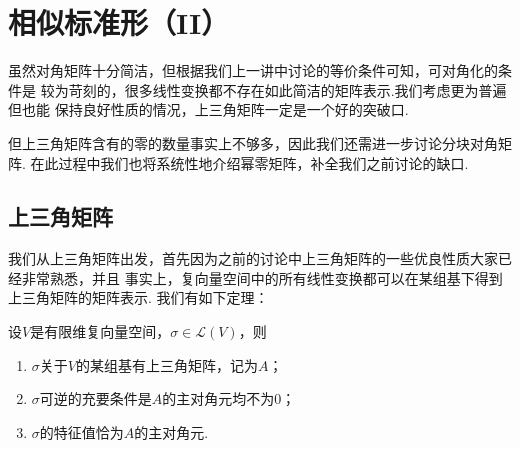 \chapter{相似标准形（II）}

虽然对角矩阵十分简洁，但根据我们上一讲中讨论的等价条件可知，可对角化的条件是
较为苛刻的，很多线性变换都不存在如此简洁的矩阵表示.我们考虑更为普遍但也能
保持良好性质的情况，上三角矩阵一定是一个好的突破口.

但上三角矩阵含有的零的数量事实上不够多，因此我们还需进一步讨论分块对角矩阵.
在此过程中我们也将系统性地介绍幂零矩阵，补全我们之前讨论的缺口.

\section{上三角矩阵}
我们从上三角矩阵出发，首先因为之前的讨论中上三角矩阵的一些优良性质大家已经非常熟悉，并且
事实上，复向量空间中的所有线性变换都可以在某组基下得到上三角矩阵的矩阵表示.
我们有如下定理：
\begin{theorem}\label{thm:19:上三角矩阵存在}
    设$V$是有限维复向量空间，$\sigma\in \mathcal{L}(V)$，则
    \begin{enumerate}
        \item $\sigma$关于$V$的某组基有上三角矩阵，记为$A$；

        \item $\sigma$可逆的充要条件是$A$的主对角元均不为0；

        \item $\sigma$的特征值恰为$A$的主对角元.
    \end{enumerate}
\end{theorem}
